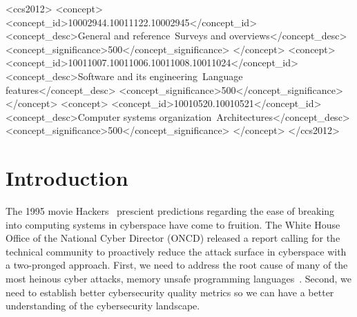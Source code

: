 \documentclass[sigconf,review,anonymous]{acmart}
\begin{document}
\begin{CCSXML}
<ccs2012>
<concept>
<concept_id>10002944.10011122.10002945</concept_id>
<concept_desc>General and reference~Surveys and overviews</concept_desc>
<concept_significance>500</concept_significance>
</concept>
<concept>
<concept_id>10011007.10011006.10011008.10011024</concept_id>
<concept_desc>Software and its engineering~Language features</concept_desc>
<concept_significance>500</concept_significance>
</concept>
<concept>
<concept_id>10010520.10010521</concept_id>
<concept_desc>Computer systems organization~Architectures</concept_desc>
<concept_significance>500</concept_significance>
</concept>
</ccs2012>
\end{CCSXML}






\maketitle

\section{Introduction}

The 1995 movie Hackers~\cite{Wikipedia_contributors2024-zr} prescient predictions regarding the ease
of breaking into computing systems in cyberspace have come to fruition. The White House Office of
the National Cyber Director (ONCD) released a report calling for the technical community to
proactively reduce the attack surface in cyberspace with a two-pronged approach. First, we need to
address the root cause of many of the most heinous cyber attacks, memory unsafe programming
languages~\cite{United_States_Gov2024-pp}. Second, we need to establish better cybersecurity quality
metrics so we can have a better understanding of the cybersecurity landscape.
\end{document}
